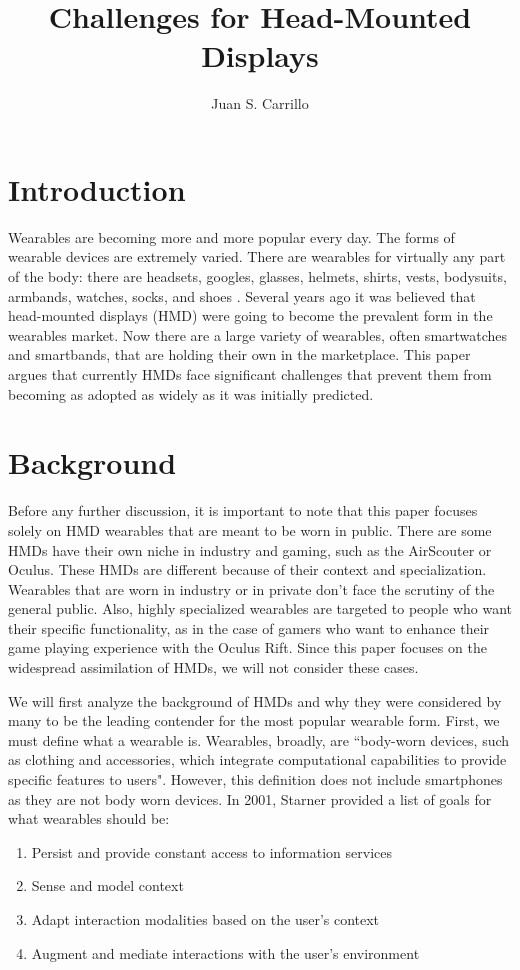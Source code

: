 \documentclass[11pt]{article}
\title{Challenges for Head-Mounted Displays}
\author{Juan S. Carrillo}
\begin{document}
\maketitle
\section{Introduction}
Wearables are becoming more and more popular every day. The forms of wearable devices are extremely varied. There are wearables for virtually any part of the body: there are headsets, googles, glasses, helmets, shirts, vests, bodysuits, armbands, watches, socks, and shoes \cite{VandricoList}. Several years ago it was believed that head-mounted displays (HMD) were going to become the prevalent form in the wearables market\cite{ultimateWearable}. Now there are a large variety of wearables, often smartwatches and smartbands, that are holding their own in the marketplace. This paper argues that currently HMDs face significant challenges that prevent them from becoming as adopted as widely as it was initially predicted.

\section{Background}

Before any further discussion, it is important to note that this paper focuses solely on HMD wearables that are meant to be worn in public. There are some HMDs have their own niche in industry and gaming, such as the AirScouter or Oculus. These HMDs are different because of their context and specialization. Wearables that are worn in industry or in private don't face the scrutiny of the general public. Also, highly specialized wearables are targeted to people who want their specific functionality, as in the case of gamers who want to enhance their game playing experience with the Oculus Rift. Since this paper focuses on the widespread assimilation of HMDs, we will not consider these cases.

We will first analyze the background of HMDs and why they were considered by many to be the leading contender for the most popular wearable form. First, we must define what a wearable is. Wearables, broadly, are ``body-worn devices, such as clothing and accessories, which integrate computational capabilities to provide specific features to users"\cite{WearableHumanView}. However, this definition does not include smartphones as they are not body worn devices. In 2001, Starner provided a list of goals for what wearables should be\cite{starnerChallenges1}:
\begin{enumerate}
    \item Persist and provide constant access to information services
    \item Sense and model context
    \item Adapt interaction modalities based on the user's context
    \item Augment and mediate interactions with the user's environment 
\end{enumerate}
\end{document}
